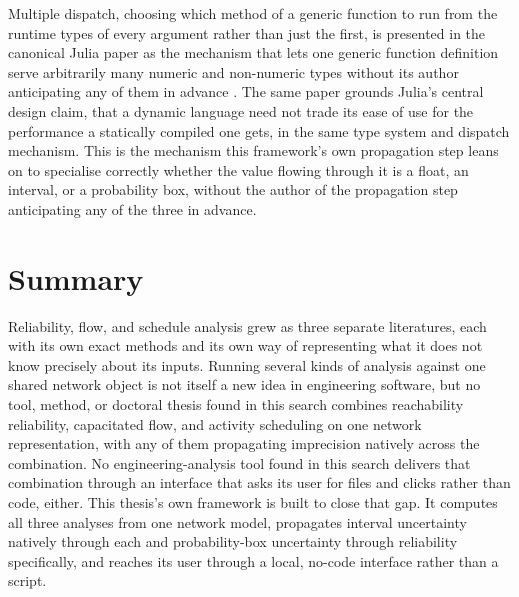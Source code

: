 \documentclass[12pt]{report}
\begin{document}
Multiple dispatch, choosing which method of a generic function to run from the runtime types of
every argument rather than just the first, is presented in the canonical Julia paper as the
mechanism that lets one generic function definition serve arbitrarily many numeric and
non-numeric types without its author anticipating any of them in advance
\cite{bezanson2017julia}. The same paper grounds Julia's central design claim, that a dynamic
language need not trade its ease of use for the performance a statically compiled one gets, in
the same type system and dispatch mechanism. This is the mechanism this framework's own
propagation step leans on to specialise correctly whether the value flowing through it is a
float, an interval, or a probability box, without the author of the propagation step anticipating
any of the three in advance.

\section{Summary}
\label{sec:bg-summary}

Reliability, flow, and schedule analysis grew as three separate literatures, each with its own
exact methods and its own way of representing what it does not know precisely about its inputs.
Running several kinds of analysis against one shared network object is not itself a new idea in
engineering software, but no tool, method, or doctoral thesis found in this search combines
reachability reliability, capacitated flow, and activity scheduling on one network
representation, with any of them propagating imprecision natively across the combination. No
engineering-analysis tool found in this search delivers that combination through an interface
that asks its user for files and clicks rather than code, either. This thesis's own framework is
built to close that gap. It computes all three analyses from one network model, propagates
interval uncertainty natively through each and probability-box uncertainty through reliability
specifically, and reaches its user through a local, no-code interface rather than a script.

\ifdefined\maindoc
\else
\printbibliography
\end{document}
